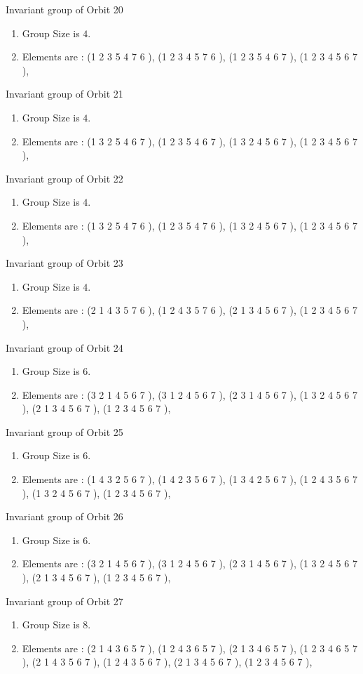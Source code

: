 \documentclass[12pt]{article}
\begin{document}
Invariant group of Orbit 20
\begin{enumerate}
\item Group Size is $4$.
\item Elements are : (1 2 3 5 4 7 6  ), (1 2 3 4 5 7 6  ), (1 2 3 5 4 6 7  ), (1 2 3 4 5 6 7  ), 
\end{enumerate}
Invariant group of Orbit 21
\begin{enumerate}
\item Group Size is $4$.
\item Elements are : (1 3 2 5 4 6 7  ), (1 2 3 5 4 6 7  ), (1 3 2 4 5 6 7  ), (1 2 3 4 5 6 7  ), 
\end{enumerate}
Invariant group of Orbit 22
\begin{enumerate}
\item Group Size is $4$.
\item Elements are : (1 3 2 5 4 7 6  ), (1 2 3 5 4 7 6  ), (1 3 2 4 5 6 7  ), (1 2 3 4 5 6 7  ), 
\end{enumerate}
Invariant group of Orbit 23
\begin{enumerate}
\item Group Size is $4$.
\item Elements are : (2 1 4 3 5 7 6  ), (1 2 4 3 5 7 6  ), (2 1 3 4 5 6 7  ), (1 2 3 4 5 6 7  ), 
\end{enumerate}
Invariant group of Orbit 24
\begin{enumerate}
\item Group Size is $6$.
\item Elements are : (3 2 1 4 5 6 7  ), (3 1 2 4 5 6 7  ), (2 3 1 4 5 6 7  ), (1 3 2 4 5 6 7  ), (2 1 3 4 5 6 7  ), (1 2 3 4 5 6 7  ), 
\end{enumerate}
Invariant group of Orbit 25
\begin{enumerate}
\item Group Size is $6$.
\item Elements are : (1 4 3 2 5 6 7  ), (1 4 2 3 5 6 7  ), (1 3 4 2 5 6 7  ), (1 2 4 3 5 6 7  ), (1 3 2 4 5 6 7  ), (1 2 3 4 5 6 7  ), 
\end{enumerate}
Invariant group of Orbit 26
\begin{enumerate}
\item Group Size is $6$.
\item Elements are : (3 2 1 4 5 6 7  ), (3 1 2 4 5 6 7  ), (2 3 1 4 5 6 7  ), (1 3 2 4 5 6 7  ), (2 1 3 4 5 6 7  ), (1 2 3 4 5 6 7  ), 
\end{enumerate}
Invariant group of Orbit 27
\begin{enumerate}
\item Group Size is $8$.
\item Elements are : (2 1 4 3 6 5 7  ), (1 2 4 3 6 5 7  ), (2 1 3 4 6 5 7  ), (1 2 3 4 6 5 7  ), (2 1 4 3 5 6 7  ), (1 2 4 3 5 6 7  ), (2 1 3 4 5 6 7  ), (1 2 3 4 5 6 7  ), 
\end{enumerate}
\end{document}
